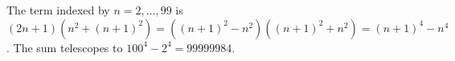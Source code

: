 The term indexed by $n=2,\ldots,99$ is $(2n+1)(n^2+(n+1)^2)=((n+1)^2-n^2)((n+1)^2+n^2)=(n+1)^4-n^4$. The sum telescopes to $100^4-2^4=\boxed{99999984}$.
